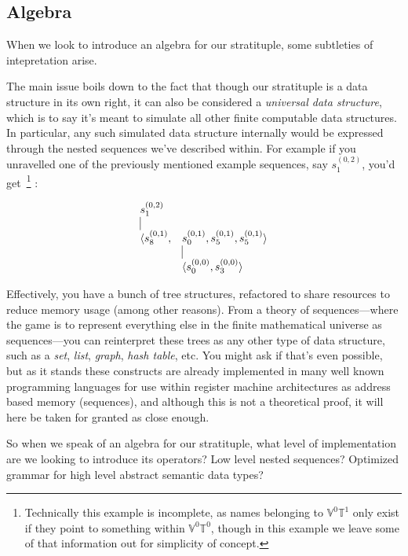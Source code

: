 \documentclass[twoside]{article}
\newcommand{\nthpt}[2][T]{\ensuremath{\mathbb{#1}^{#2}}}
\newcommand{\nthut}[2][V]{\ensuremath{\mathbb{#1}^{#2}}}
\newcommand{\sifter}[3]{\ensuremath{s^{(#1, #2)}_{#3}}}
\begin{document}
\subsection*{Algebra}

When we look to introduce an algebra for our stratituple, some subtleties of intepretation arise.

The main issue boils down to the fact that though our stratituple is a data structure in its own right, it can also be
considered a \emph{universal data structure}, which is to say it's meant to simulate all other finite computable data structures.
In particular, any such simulated data structure internally would be expressed through the nested sequences we've described within.
For example if you unravelled one of the previously mentioned example sequences, say $ \sifter{0}{2}{1} $, you'd
get\ \footnote{Technically this example is incomplete, as names belonging to $ \nthut{0}\nthpt{1} $ only exist if they point to
something within $ \nthut{0}\nthpt{0} $, though in this example we leave some of that information out for simplicity of concept.} :

$$ \begin{array}{ll}
\sifter{0}{2}{1}		& 									\\
\vline													\\
\langle\sifter{0}{1}{8},	& \sifter{0}{1}{0}, \sifter{0}{1}{5}, \sifter{0}{1}{5}\rangle		\\
				& \vline								\\
				& \langle\sifter{0}{0}{0}, \sifter{0}{0}{3}\rangle
\end{array} $$

Effectively, you have a bunch of tree structures, refactored to share resources to reduce memory usage (among other reasons).
From a theory of sequences---where the game is to represent everything else in the finite mathematical universe as sequences---you
can reinterpret these trees as any other type of data structure, such as a \emph{set}, \emph{list}, \emph{graph}, \emph{hash table},
etc. You might ask if that's even possible, but as it stands these constructs are already implemented in many well known programming
languages for use within register machine architectures as address based memory (sequences), and although this is not a theoretical
proof, it will here be taken for granted as close enough.

So when we speak of an algebra for our stratituple, what level of implementation are we looking to introduce its operators?
Low level nested sequences? Optimized grammar for high level abstract semantic data types?
\end{document}
